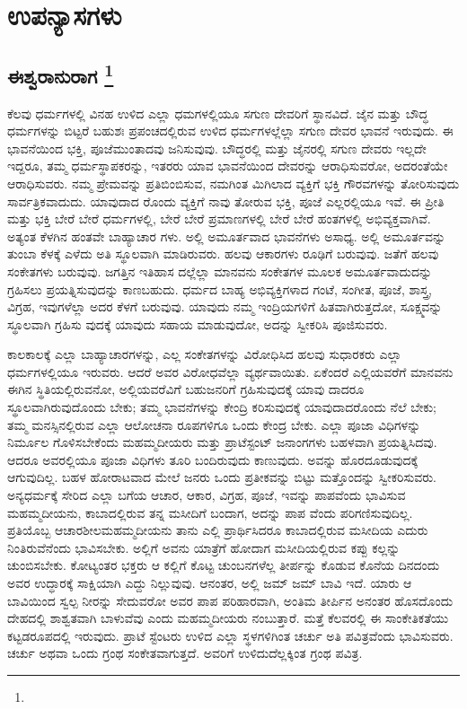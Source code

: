 

\part{ಉಪನ್ಯಾಸಗಳು}

\mainmatter

\chapter[ಈಶ್ವರಾನುರಾಗ]{ಈಶ್ವರಾನುರಾಗ \protect\footnote{}}

ಕೆಲವು ಧರ್ಮಗಳಲ್ಲಿ ವಿನಹ ಉಳಿದ ಎಲ್ಲಾ ಧಮಗಳಲ್ಲಿಯೂ ಸಗುಣ ದೇವರಿಗೆ ಸ್ಥಾನವಿದೆ. ಜೈನ ಮತ್ತು ಬೌದ್ಧ ಧರ್ಮಗಳನ್ನು ಬಿಟ್ಟರೆ ಬಹುಶಃ ಪ್ರಪಂಚದಲ್ಲಿರುವ ಉಳಿದ ಧರ್ಮಗಳಲ್ಲೆಲ್ಲಾ ಸಗುಣ ದೇವರ ಭಾವನೆ ಇರುವುದು. ಈ ಭಾವನೆಯಿಂದ ಭಕ್ತಿ, ಪೂಜೆ\break ಮುಂತಾದವು ಜನಿಸುವುವು. ಬೌದ್ಧರಲ್ಲಿ ಮತ್ತು ಜೈನರಲ್ಲಿ ಸಗುಣ ದೇವರು ಇಲ್ಲದೇ ಇದ್ದರೂ, ತಮ್ಮ ಧರ್ಮಸ್ಥಾಪಕರನ್ನು, ಇತರರು ಯಾವ ಭಾವನೆಯಿಂದ ದೇವರನ್ನು ಆರಾಧಿಸುವರೋ, ಅದರಂತೆಯೇ ಆರಾಧಿಸುವರು. ನಮ್ಮ ಪ್ರೇಮವನ್ನು ಪ್ರತಿಬಿಂಬಿಸುವ, ನಮಗಿಂತ ಮಿಗಿಲಾದ ವ್ಯಕ್ತಿಗೆ ಭಕ್ತಿ ಗೌರವಗಳನ್ನು ತೋರಿಸುವುದು ಸಾರ್ವತ್ರಿಕ\-ವಾದುದು. ಯಾವುದಾದ ರೊಂದು ವ್ಯಕ್ತಿಗೆ ನಾವು ತೋರುವ ಭಕ್ತಿ, ಪೂಜೆ ಎಲ್ಲರಲ್ಲಿಯೂ ಇವೆ. ಈ ಪ್ರೀತಿ ಮತ್ತು ಭಕ್ತಿ ಬೇರೆ ಬೇರೆ ಧರ್ಮಗಳಲ್ಲಿ, ಬೇರೆ ಬೇರೆ ಪ್ರಮಾಣಗಳಲ್ಲಿ ಬೇರೆ ಬೇರೆ ಹಂತಗಳಲ್ಲಿ ಅಭಿವ್ಯಕ್ತವಾಗಿವೆ. ಅತ್ಯಂತ ಕೆಳಗಿನ ಹಂತವೇ ಬಾಹ್ಯಾಚಾರ ಗಳು. ಅಲ್ಲಿ ಅಮೂರ್ತವಾದ ಭಾವನೆಗಳು ಅಸಾಧ್ಯ. ಅಲ್ಲಿ ಅಮೂರ್ತವನ್ನು ತುಂಬಾ ಕೆಳಕ್ಕೆ ಎಳೆದು ಅತಿ ಸ್ಥೂಲವಾಗಿ ಮಾಡಿರುವರು. ಹಲವು ಆಕಾರಗಳು ರೂಢಿಗೆ ಬರುವುವು. ಜತೆಗೆ ಹಲವು ಸಂಕೇತಗಳು ಬರುವುವು. ಜಗತ್ತಿನ ಇತಿಹಾಸ ದಲ್ಲೆಲ್ಲಾ ಮಾನವನು ಸಂಕೇತಗಳ ಮೂಲಕ ಅಮೂರ್ತವಾದುದನ್ನು ಗ್ರಹಿಸಲು ಪ್ರಯತ್ನಿಸುವುದನ್ನು ಕಾಣಬಹುದು. ಧರ್ಮದ ಬಾಹ್ಯ ಅಭಿವ್ಯಕ್ತಿಗಳಾದ ಗಂಟೆ, ಸಂಗೀತ, ಪೂಜೆ, ಶಾಸ್ತ್ರ, ವಿಗ್ರಹ, ಇವುಗಳೆಲ್ಲಾ ಅದರ ಕೆಳಗೆ ಬರುವುವು. ಯಾವುದು ನಮ್ಮ ಇಂದ್ರಿಯಗಳಿಗೆ ಹಿತವಾಗಿರುತ್ತದೋ, ಸೂಕ್ಷ್ಮವನ್ನು ಸ್ಥೂಲವಾಗಿ ಗ್ರಹಿಸು ವುದಕ್ಕೆ ಯಾವುದು ಸಹಾಯ ಮಾಡುವುದೋ, ಅದನ್ನು ಸ್ವೀಕರಿಸಿ ಪೂಜಿಸುವರು.

ಕಾಲಕಾಲಕ್ಕೆ ಎಲ್ಲಾ ಬಾಹ್ಯಾಚಾರಗಳನ್ನು, ಎಲ್ಲ ಸಂಕೇತಗಳನ್ನು ವಿರೋಧಿಸಿದ ಹಲವು ಸುಧಾರಕರು ಎಲ್ಲಾ ಧರ್ಮಗಳಲ್ಲಿಯೂ ಇರುವರು. ಆದರೆ ಅವರ ವಿರೋಧವೆಲ್ಲಾ ವ್ಯರ್ಥವಾಯಿತು. ಏಕೆಂದರೆ ಎಲ್ಲಿಯವರೆಗೆ ಮಾನವನು ಈಗಿನ ಸ್ಥಿತಿಯಲ್ಲಿರುವನೋ, ಅಲ್ಲಿಯವರೆವಿಗೆ ಬಹುಜನರಿಗೆ ಗ್ರಹಿಸುವುದಕ್ಕೆ ಯಾವು ದಾದರೂ ಸ್ಥೂಲವಾಗಿರುವುದೊಂದು ಬೇಕು; ತಮ್ಮ ಭಾವನೆಗಳನ್ನು ಕೇಂದ್ರಿ ಕರಿಸುವುದಕ್ಕೆ ಯಾವುದಾದರೊಂದು ನೆಲೆ ಬೇಕು; ತಮ್ಮ ಮನಸ್ಸಿನಲ್ಲಿರುವ ಎಲ್ಲಾ ಆಲೋಚನಾ ರೂಪಗಳಿಗೂ ಒಂದು ಕೇಂದ್ರ ಬೇಕು. ಎಲ್ಲಾ ಪೂಜಾ ವಿಧಿಗಳನ್ನು ನಿರ್ಮೂಲ ಗೊಳಿಸಬೇಕೆಂದು ಮಹಮ್ಮದೀಯರು ಮತ್ತು ಪ್ರಾಟೆಸ್ಟಂಟ್​ ಜನಾಂಗಗಳು ಬಹಳವಾಗಿ ಪ್ರಯತ್ನಿಸಿದವು. ಆದರೂ ಅವರಲ್ಲಿಯೂ ಪೂಜಾ ವಿಧಿಗಳು ತೂರಿ ಬಂದಿರುವುದು ಕಾಣುವುದು. ಅವನ್ನು ಹೊರದೂಡುವುದಕ್ಕೆ ಆಗುವುದಿಲ್ಲ. ಬಹಳ ಹೋರಾಟವಾದ ಮೇಲೆ ಜನರು ಒಂದು ಪ್ರತೀಕವನ್ನು ಬಿಟ್ಟು ಮತ್ತೊಂದನ್ನು ಸ್ವೀಕರಿಸುವರು. ಅನ್ಯಧರ್ಮಕ್ಕೆ ಸೇರಿದ ಎಲ್ಲಾ ಬಗೆಯ ಆಚಾರ, ಆಕಾರ, ವಿಗ್ರಹ, ಪೂಜೆ, ಇವನ್ನು ಪಾಪವೆಂದು ಭಾವಿಸುವ ಮಹಮ್ಮದೀಯನು, ಕಾಬಾದಲ್ಲಿರುವ ತನ್ನ ಮಸೀದಿಗೆ ಬಂದಾಗ, ಅದನ್ನು ಪಾಪ ವೆಂದು ಪರಿಗಣಿಸುವುದಿಲ್ಲ. ಪ್ರತಿಯೊಬ್ಬ ಆಚಾರಶೀಲ\break ಮಹಮ್ಮದೀಯನು ತಾನು ಎಲ್ಲಿ ಪ್ರಾರ್ಥಿಸಿದರೂ ಕಾಬಾದಲ್ಲಿರುವ ಮಸೀದಿಯ ಎದುರು ನಿಂತಿರುವೆನೆಂದು ಭಾವಿಸಬೇಕು. ಅಲ್ಲಿಗೆ ಅವನು ಯಾತ್ರೆಗೆ ಹೋದಾಗ ಮಸೀದಿಯಲ್ಲಿರುವ ಕಪ್ಪು ಕಲ್ಲನ್ನು ಚುಂಬಿಸಬೇಕು. ಕೋಟ್ಯಂತರ ಭಕ್ತರು ಆ ಕಲ್ಲಿಗೆ ಕೊಟ್ಟ ಚುಂಬನಗಳೆಲ್ಲ ತೀರ್ಪನ್ನು ಕೊಡುವ ಕೊನೆಯ ದಿನದಂದು ಅವರ ಉದ್ಧಾರಕ್ಕೆ ಸಾಕ್ಷಿಯಾಗಿ ಎದ್ದು ನಿಲ್ಲುವುವು. ಆನಂತರ, ಅಲ್ಲಿ ಜಮ್​ ಜಮ್​ ಬಾವಿ ಇದೆ. ಯಾರು ಆ ಬಾವಿಯಿಂದ ಸ್ವಲ್ಪ ನೀರನ್ನು ಸೇದುವರೋ ಅವರ ಪಾಪ ಪರಿಹಾರವಾಗಿ, ಅಂತಿಮ ತೀರ್ಪಿನ ಅನಂತರ ಹೊಸದೊಂದು ದೇಹದಲ್ಲಿ ಶಾಶ್ವತವಾಗಿ ಬಾಳುವೆವು ಎಂದು ಮಹಮ್ಮದೀಯರು ನಂಬುತ್ತಾರೆ. ಮತ್ತೆ ಕೆಲವರಲ್ಲಿ ಈ ಸಾಂಕೇತಿಕತೆಯು ಕಟ್ಟಡರೂಪದಲ್ಲಿ ಇರುವುದು. ಪ್ರಾಟೆ ಸ್ಟೆಂಟರು ಉಳಿದ ಎಲ್ಲಾ ಸ್ಥಳಗಳಿಗಿಂತ ಚರ್ಚು ಅತಿ ಪವಿತ್ರವೆಂದು ಭಾವಿಸುವರು. ಚರ್ಚು ಅಥವಾ ಒಂದು ಗ್ರಂಥ ಸಂಕೇತವಾಗುತ್ತದೆ. ಅವರಿಗೆ ಉಳಿದುದೆಲ್ಲಕ್ಕಿಂತ ಗ್ರಂಥ ಪವಿತ್ರ.

